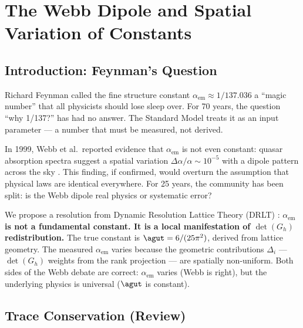 \section{The Webb Dipole and Spatial Variation of Constants}
\label{ch:webb_dipole}

\subsection{Introduction: Feynman's Question}

Richard Feynman called the fine structure constant $\alpha_\text{em} \approx 1/137.036$ a ``magic number'' that all physicists should lose sleep over. For 70 years, the question ``why 1/137?'' has had no answer. The Standard Model treats it as an input parameter --- a number that must be measured, not derived.

In 1999, Webb et al.\ reported evidence that $\alpha_\text{em}$ is not even constant: quasar absorption spectra suggest a spatial variation $\Delta\alpha/\alpha \sim 10^{-5}$ with a dipole pattern across the sky \cite{Webb}. This finding, if confirmed, would overturn the assumption that physical laws are identical everywhere. For 25 years, the community has been split: is the Webb dipole real physics or systematic error?

We propose a resolution from Dynamic Resolution Lattice Theory (DRLT) : \textbf{$\alpha_\text{em}$ is not a fundamental constant. It is a local manifestation of $\det(G_h)$ redistribution.} The true constant is $\agut = 6/(25\pi^2)$, derived from lattice geometry. The measured $\alpha_\text{em}$ varies because the geometric contributions $\Delta_i$ --- $\det(G_h)$ weights from the rank projection --- are spatially non-uniform. Both sides of the Webb debate are correct: $\alpha_\text{em}$ varies (Webb is right), but the underlying physics is universal ($\agut$ is constant).

\subsection{Trace Conservation (Review)}

